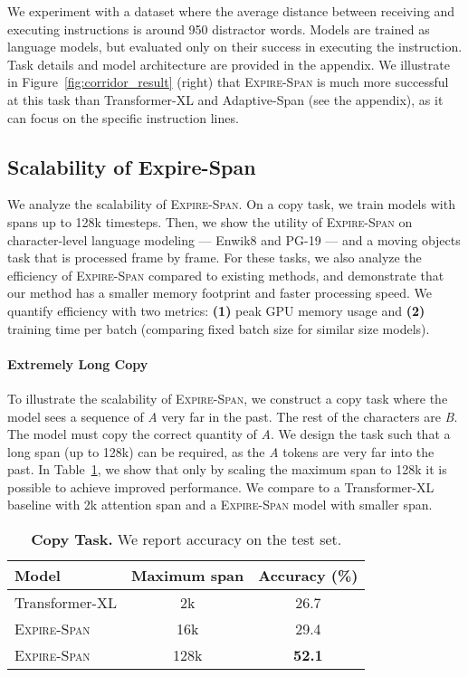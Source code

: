 We experiment with a dataset where the average distance between receiving and executing instructions is around 950 distractor words. Models are trained as language models, but evaluated only on their success in executing the instruction. 
Task details and model architecture are provided in the appendix. We illustrate in Figure~\ref{fig:corridor_result} (right) that \textsc{Expire-Span} is much more successful at this task than Transformer-XL and Adaptive-Span (see the appendix), as it can focus on the specific instruction lines. 



\subsection{Scalability of Expire-Span}

We analyze the scalability of \textsc{Expire-Span}. On a copy task, we train models with spans up to 128k timesteps. Then, we show the utility of \textsc{Expire-Span} on character-level language modeling --- Enwik8 and PG-19 --- and a moving objects task that is processed frame by frame. For these tasks, we also analyze the efficiency of \textsc{Expire-Span} compared to existing methods, and demonstrate that our method has a smaller memory footprint and faster processing speed. We quantify efficiency with two metrics: \textbf{(1)} peak GPU memory usage and \textbf{(2)} training time per batch (comparing fixed batch size for similar size models). 


\paragraph{Extremely Long Copy}

To illustrate the scalability of \textsc{Expire-Span}, we construct a copy task where the model sees a sequence of \textit{A} very far in the past. The rest of the characters are \textit{B}. The model must copy the correct quantity of \textit{A}. We design the task such that a long span (up to 128k) can be required, as the \textit{A} tokens are very far into the past. In Table~\ref{tab:copy}, we show that only by scaling the maximum span to 128k it is possible to achieve improved performance. We compare to a Transformer-XL baseline with 2k attention span and a \textsc{Expire-Span} model with smaller span.

\begin{table}
    \centering
    \begin{tabular}{lcc}
    \toprule
    Model & Maximum span & Accuracy (\%) \\
    \midrule
    Transformer-XL & 2k &  26.7 \\ 
    \textsc{Expire-Span} & 16k &  29.4 \\ 
    \textsc{Expire-Span} & 128k & \bf 52.1 \\ 
    \bottomrule
    \end{tabular}
    \caption{
    \textbf{Copy Task.} We report accuracy on the test set.
    }
    \label{tab:copy}
\end{table}


